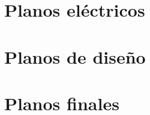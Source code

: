 \section{Planos eléctricos}

\section{Planos de diseño}





\section{Planos finales}


















% 

